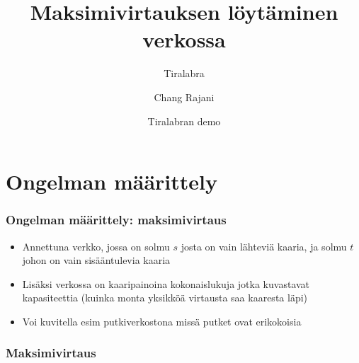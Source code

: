 \documentclass[finnish, svgnames]{beamer}
\begin{document}
    \title[] %
{Maksimivirtauksen löytäminen verkossa}
\subtitle{Tiralabra}
\author[Chang Rajani] %
{Chang Rajani}
\date[2016] %
{Tiralabran demo}
\subject{Computer Science}

\frame{\titlepage}




\section{Ongelman määrittely}
\begin{frame}
  \frametitle{Ongelman määrittely: maksimivirtaus}
  \begin{itemize}
    \item Annettuna verkko, jossa on solmu $s$ josta on vain lähteviä kaaria, ja solmu $t$ johon on vain sisääntulevia kaaria
    \item Lisäksi verkossa on kaaripainoina kokonaislukuja jotka kuvastavat kapasiteettia (kuinka monta yksikköä virtausta saa kaaresta läpi)
    \item Voi kuvitella esim putkiverkostona missä putket ovat erikokoisia
  \end{itemize}

\end{frame}

  \begin{frame}
  \frametitle{Maksimivirtaus}
  \begin{figure}[t]
  \label{fig:verkko}
  \end{figure}
  \end{frame}
\end{document}
